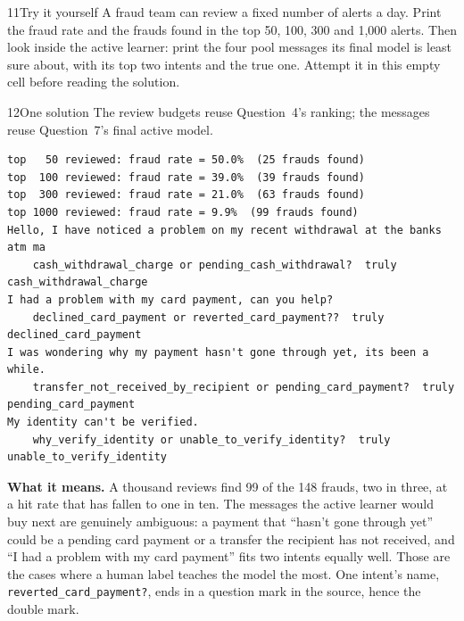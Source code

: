 
\begin{labquestion}{11}{Try it yourself}
A fraud team can review a fixed number of alerts a day. Print the fraud rate and the frauds found in the top 50, 100, 300 and 1,000 alerts. Then look inside the active learner: print the four pool messages its final model is least sure about, with its top two intents and the true one. Attempt it in this empty cell before reading the solution.
\end{labquestion}

\begin{labquestion}{12}{One solution}
The review budgets reuse Question~4's ranking; the messages reuse Question~7's final active model.
\end{labquestion}
\begin{labanswer}

\begin{refoutput}
\begin{lstlisting}[style=utpterminal]
top   50 reviewed: fraud rate = 50.0%  (25 frauds found)
top  100 reviewed: fraud rate = 39.0%  (39 frauds found)
top  300 reviewed: fraud rate = 21.0%  (63 frauds found)
top 1000 reviewed: fraud rate = 9.9%  (99 frauds found)
Hello, I have noticed a problem on my recent withdrawal at the banks atm ma
    cash_withdrawal_charge or pending_cash_withdrawal?  truly cash_withdrawal_charge
I had a problem with my card payment, can you help?
    declined_card_payment or reverted_card_payment??  truly declined_card_payment
I was wondering why my payment hasn't gone through yet, its been a while.
    transfer_not_received_by_recipient or pending_card_payment?  truly pending_card_payment
My identity can't be verified.
    why_verify_identity or unable_to_verify_identity?  truly unable_to_verify_identity
\end{lstlisting}
\end{refoutput}

\textbf{What it means.} A thousand reviews find 99 of the 148 frauds, two in three, at a hit rate that has fallen to one in ten. The messages the active learner would buy next are genuinely ambiguous: a payment that ``hasn't gone through yet'' could be a pending card payment or a transfer the recipient has not received, and ``I had a problem with my card payment'' fits two intents equally well. Those are the cases where a human label teaches the model the most. One intent's name, \texttt{reverted\_card\_payment?}, ends in a question mark in the source, hence the double mark.
\end{labanswer}

